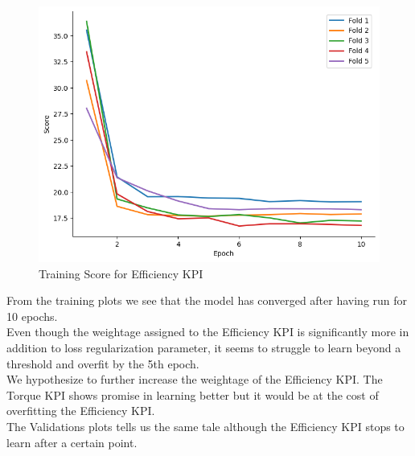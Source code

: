\documentclass{report} %
\begin{document}
\begin{figure}[H]
    \hfill
    \begin{minipage}[b]{0.325\textwidth}
        \includegraphics[width=\textwidth]{./ReportImages/train_score_y2.png}
        \caption{\centering Training Score for Efficiency \ac{KPI}}
        \label{fig:Training Score for Efficiency grid}
    \end{minipage}
\end{figure}

From the training plots we see that the model has converged after having run for 10 epochs.\\
Even though the weightage assigned to the Efficiency \ac{KPI} is significantly more in addition to loss regularization parameter, it seems to struggle to learn beyond a threshold and overfit by the 5th epoch.\\
We hypothesize to further increase the weightage of the Efficiency \ac{KPI}.
The Torque \ac{KPI} shows promise in learning better but it would be at the cost of overfitting the Efficiency \ac{KPI}.\\
The Validations plots tells us the same tale although the Efficiency \ac{KPI} stops to learn after a certain point.
\end{document}
